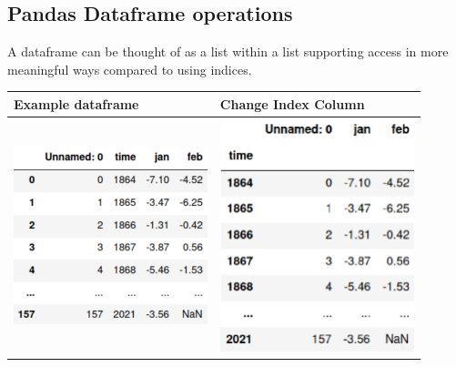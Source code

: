 \subsection{Pandas Dataframe operations}
A dataframe can be thought of as a list within a list supporting access in more meaningful ways compared to using indices.

\begin{tabular*}{\linewidth}{m{0.45\linewidth} | m{0.45\linewidth} |}
    \textbf{Example dataframe} & \textbf{Change Index Column}\\
    \hline
    \includegraphics[width=\linewidth]{src/10_pandas/images/pd_dataframe_index.png} & \includegraphics[width = 0.8\linewidth]{src/10_pandas/images/pd_dataframe_time.png}\\

\end{tabular*}
